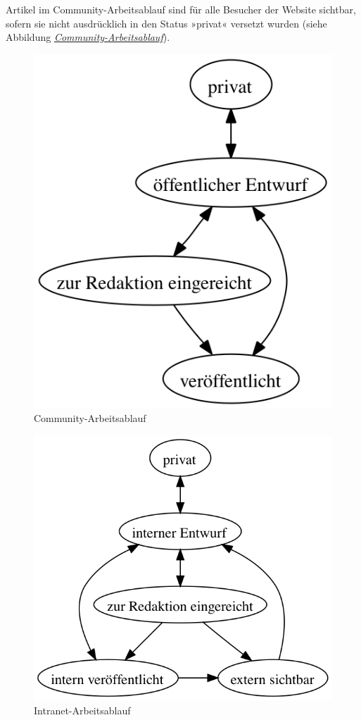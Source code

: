 \documentclass[a4paper,12pt,ngerman]{manual}
\begin{document}
Artikel im Community-Arbeitsablauf sind für alle Besucher der Website
sichtbar, sofern sie nicht ausdrücklich in den Status »privat« versetzt
wurden (siehe Abbildung \hyperlink{fig-workflow-community}{\emph{Community-Arbeitsablauf}}).
\hypertarget{fig-workflow-community}{}\begin{figure}[htbp]
\centering

\includegraphics{workflow-community.png}
\caption{Community-Arbeitsablauf}\end{figure}
\hypertarget{fig-workflow-intranet}{}\begin{figure}[htbp]
\centering

\includegraphics{workflow-intranet.png}
\caption{Intranet-Arbeitsablauf}\end{figure}
\end{document}
